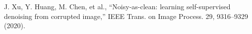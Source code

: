 J. Xu, Y. Huang, M. Chen, et al., “Noisy-as-clean: learning self-supervised denoising from corrupted image,” IEEE Trans. on Image Process. 29, 9316–9329 (2020).
